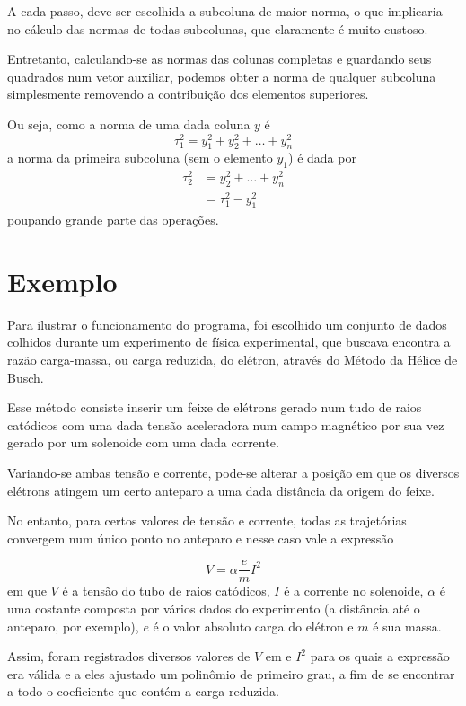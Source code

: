 \documentclass[a4paper,11pt]{article}
\begin{document}
            A cada passo, deve ser escolhida a subcoluna de maior norma, o que implicaria no cálculo das normas de todas subcolunas, que claramente é muito custoso.

            Entretanto, calculando-se as normas das colunas completas e guardando seus quadrados num vetor auxiliar, podemos obter a norma de qualquer subcoluna simplesmente removendo a contribuição dos elementos superiores.

            Ou seja, como a norma de uma dada coluna $y$ é
            $$ \tau_1^2 = y_1^2 + y_2^2 + \dots + y_n^2 $$
            a norma da primeira subcoluna (sem o elemento $y_1$) é dada por
            \begin{align*}
                \tau_2^2 &= y_2^2 + \dots + y_n^2 \\
                         &= \tau_1^2 - y_1^2
            \end{align*}
            poupando grande parte das operações.

    \section*{Exemplo}
        Para ilustrar o funcionamento do programa, foi escolhido um conjunto de dados colhidos durante um experimento de física experimental, que buscava encontra a razão carga-massa, ou carga reduzida, do elétron, através do Método da Hélice de Busch.

        Esse método consiste inserir um feixe de elétrons gerado num tudo de raios catódicos com uma dada tensão aceleradora num campo magnético por sua vez gerado por um solenoide com uma dada corrente.

        Variando-se ambas tensão e corrente, pode-se alterar a posição em que os diversos elétrons atingem um certo anteparo a uma dada distância da origem do feixe.

        No entanto, para certos valores de tensão e corrente, todas as trajetórias convergem num único ponto no anteparo e nesse caso vale a expressão

        $$ V = \alpha \frac{e}{m}I^2 $$
        em que $V$ é a tensão do tubo de raios catódicos, $I$ é a corrente no solenoide, $\alpha$ é uma costante composta por vários dados do experimento (a distância até o anteparo, por exemplo), $e$ é o valor absoluto carga do elétron e $m$ é sua massa.

        Assim, foram registrados diversos valores de $V$ em e $I^2$ para os quais a expressão era válida e a eles ajustado um polinômio de primeiro grau, a fim de se encontrar a todo o coeficiente que contém a carga reduzida.
\end{document}
